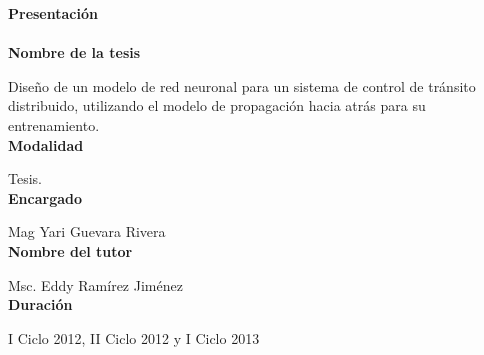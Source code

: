 \textbf{\LARGE{Presentaci\'{o}n}}\\\\

\textbf{Nombre de la tesis}


Dise\~{n}o de un modelo de red neuronal para un sistema de control de
tr\'{a}nsito distribuido, utilizando el modelo de propagaci\'{o}n hacia atr\'{a}s para su entrenamiento.\\

\textbf{Modalidad}

Tesis. \\
	
\textbf{Encargado}

Mag Yari Guevara Rivera \\
	
\textbf{Nombre del tutor}


 Msc. Eddy Ram\'{i}rez Jim\'{e}nez \\
	 
	
\textbf{Duraci\'{o}n}

 I Ciclo 2012, II Ciclo 2012 y I Ciclo 2013